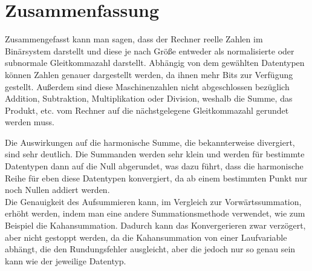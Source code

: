 \documentclass{scrartcl}
\begin{document}
\section{Zusammenfassung}
Zusammengefasst kann man sagen, dass der Rechner reelle Zahlen im Binärsystem
darstellt und diese je nach Größe entweder als normalisierte oder subnormale
Gleitkommazahl darstellt.
Abhängig von dem gewählten Datentypen können Zahlen genauer dargestellt werden,
da ihnen mehr Bits zur Verfügung gestellt.
Außerdem sind diese Maschinenzahlen nicht abgeschlossen bezüglich Addition,
Subtraktion, Multiplikation oder Division, weshalb die Summe, das Produkt, etc.
vom Rechner auf die nächstgelegene Gleitkommazahl gerundet werden muss.
\begin{flushleft}
    Die Auswirkungen auf die harmonische Summe, die bekannterweise divergiert, sind
    sehr deutlich.
    Die Summanden werden sehr klein und werden für bestimmte Datentypen dann auf
    die Null abgerundet, was dazu führt, dass die harmonische Reihe für eben diese
    Datentypen konvergiert, da ab einem bestimmten Punkt nur noch Nullen addiert
    werden.
    \\
    Die Genauigkeit des Aufsummieren kann, im Vergleich zur Vorwärtssummation, erhöht werden, indem man eine andere
    Summationsmethode verwendet, wie zum Beispiel die Kahansummation.
    Dadurch kann das Konvergerieren zwar verzögert, aber nicht gestoppt werden, da
    die Kahansummation von einer Laufvariable abhängt, die den Rundungsfehler
    ausgleicht, aber die jedoch nur so genau sein kann wie der jeweilige Datentyp.
\end{flushleft}
\end{document}
